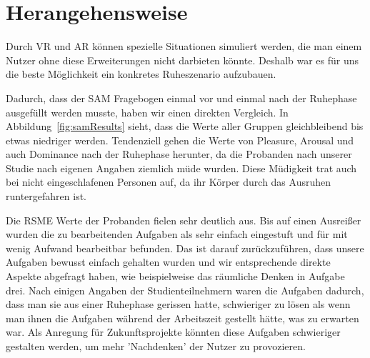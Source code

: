 \section{Herangehensweise}

Durch VR und AR können spezielle Situationen simuliert werden, die man einem Nutzer ohne diese Erweiterungen nicht darbieten könnte. Deshalb war es für uns die beste Möglichkeit ein konkretes Ruheszenario aufzubauen. 



Dadurch, dass der SAM Fragebogen einmal vor und einmal nach der Ruhephase ausgefüllt werden musste, haben wir einen direkten Vergleich. In Abbildung~\ref{fig:samResults} sieht, dass die Werte aller Gruppen gleichbleibend bis etwas niedriger werden. Tendenziell gehen die Werte von Pleasure, Arousal und auch Dominance nach der Ruhephase herunter, da die Probanden nach unserer Studie nach eigenen Angaben ziemlich müde wurden. Diese Müdigkeit trat auch bei nicht eingeschlafenen Personen auf, da ihr Körper durch das Ausruhen runtergefahren ist. 

Die RSME Werte der Probanden fielen sehr deutlich aus. Bis auf einen Ausreißer wurden die zu bearbeitenden Aufgaben als sehr einfach eingestuft und für mit wenig Aufwand bearbeitbar befunden. Das ist darauf zurückzuführen, dass unsere Aufgaben bewusst einfach gehalten wurden und wir entsprechende direkte Aspekte abgefragt haben, wie beispielweise das räumliche Denken in Aufgabe drei. Nach einigen Angaben der Studienteilnehmern waren die Aufgaben dadurch, dass man sie aus einer Ruhephase gerissen hatte, schwieriger zu lösen als wenn man ihnen die Aufgaben während der Arbeitszeit gestellt hätte, was zu erwarten war. Als Anregung für Zukunftsprojekte könnten diese Aufgaben schwieriger gestalten werden, um mehr 'Nachdenken' der Nutzer zu provozieren.